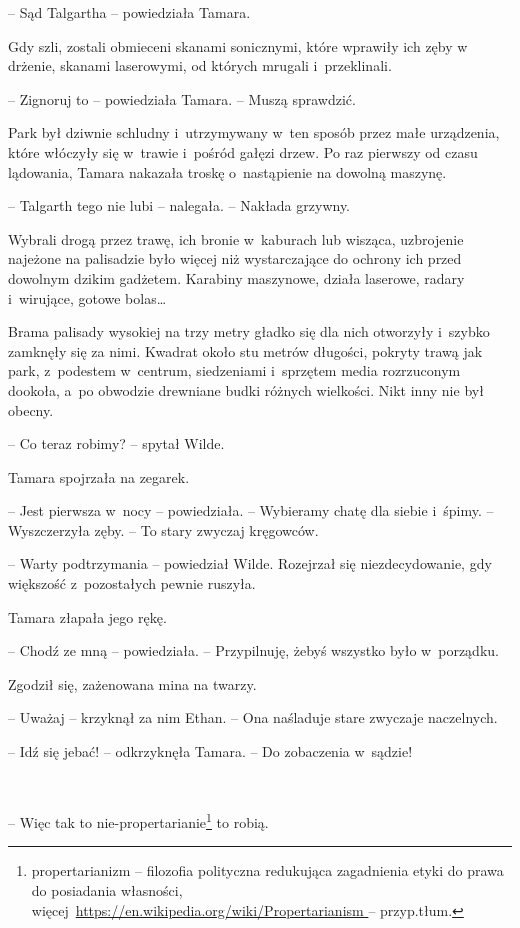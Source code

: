 \documentclass[oneside,polish,11pt,sfheadings]{mwbk}
\begin{document}
-- Sąd Talgartha -- powiedziała Tamara.

Gdy szli, zostali obmieceni skanami sonicznymi, które wprawiły ich zęby
w drżenie, skanami laserowymi, od których mrugali i~przeklinali.

-- Zignoruj to -- powiedziała Tamara. -- Muszą sprawdzić.

Park był dziwnie schludny i~utrzymywany w~ten sposób przez małe
urządzenia, które włóczyły się w~trawie i~pośród gałęzi drzew. Po raz
pierwszy od czasu lądowania, Tamara nakazała troskę o~nastąpienie na
dowolną maszynę.

-- Talgarth tego nie lubi -- nalegała. -- Nakłada grzywny.

Wybrali drogą przez trawę, ich bronie w~kaburach lub wisząca, uzbrojenie
najeżone na palisadzie było więcej niż wystarczające do ochrony ich
przed dowolnym dzikim gadżetem. Karabiny maszynowe, działa laserowe,
radary i~wirujące, gotowe bolas\ldots

Brama palisady wysokiej na trzy metry gładko się dla nich otworzyły i~szybko zamknęły się za nimi. Kwadrat około stu metrów długości, pokryty
trawą jak park, z~podestem w~centrum, siedzeniami i~sprzętem media
rozrzuconym dookoła, a~po obwodzie drewniane budki różnych wielkości.
Nikt inny nie był obecny.

-- Co teraz robimy? -- spytał Wilde.

Tamara spojrzała na zegarek. 

-- Jest pierwsza w~nocy -- powiedziała. -- Wybieramy chatę dla siebie i~śpimy. -- Wyszczerzyła zęby. -- To stary
zwyczaj kręgowców.

-- Warty podtrzymania -- powiedział Wilde. Rozejrzał się niezdecydowanie,
gdy większość z~pozostałych pewnie ruszyła.

Tamara złapała jego rękę.

-- Chodź ze mną -- powiedziała. -- Przypilnuję, żebyś wszystko było w~porządku.

Zgodził się, zażenowana mina na twarzy.

-- Uważaj -- krzyknął za nim Ethan. -- Ona naśladuje stare zwyczaje
naczelnych.

-- Idź się jebać! -- odkrzyknęła Tamara. -- Do zobaczenia w~sądzie!

~

-- Więc tak to nie-propertarianie\footnote{propertarianizm -- filozofia polityczna redukująca zagadnienia etyki do prawa do posiadania
własności,
więcej~\url{https://en.wikipedia.org/wiki/Propertarianism } -- przyp.tłum.} to robią. 
\end{document}

